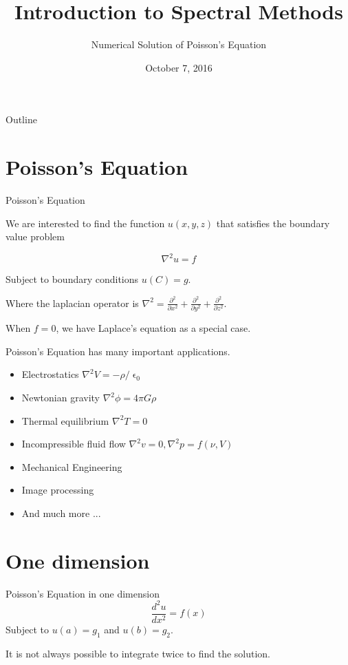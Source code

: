 \documentclass[xcolor={dvipsnames}]{beamer}
\title{Introduction to Spectral Methods}
\subtitle{Numerical Solution of Poisson's Equation}
\date{October 7, 2016}
\begin{document}
\begin{frame}
	\titlepage
\end{frame}

\begin{frame}{Outline}
	\tableofcontents
\end{frame}


\section{Poisson's Equation}
\begin{frame}{Poisson's Equation}{}

We are interested to find the function $u(x,y,z)$ that satisfies the boundary value problem

\begin{equation*}
\nabla^2 u = f
\end{equation*}

Subject to boundary conditions $u(C)=g$.

\pause
\bigskip
Where the laplacian operator is $\nabla^2=\frac{\partial^2}{\partial x^2}+\frac{\partial^2}{\partial y^2}+\frac{\partial^2}{\partial z^2}$.

\pause
\bigskip
When $f=0$, we have Laplace's equation as a special case.
\end{frame}


\begin{frame}{Poisson's Equation has many important applications.}{}
\begin{itemize}[<+->]
\item Electrostatics $\nabla^2 V = - \rho/\upvarepsilon_0$
\item Newtonian gravity $\nabla^2 \phi = 4\pi G\rho$
\item Thermal equilibrium $\nabla^2 T = 0$
\item Incompressible fluid flow $\nabla^2 v = 0, \nabla^2 p = f(\nu,V)$
\item Mechanical Engineering 
\item Image processing
\item And much more ...
\end{itemize}

\end{frame}


\section{One dimension}
\begin{frame}{Poisson's Equation in one dimension}{}
\begin{equation*}
\frac{d^2u}{dx^2}=f(x)
\end{equation*}
\vfill
Subject to $u(a)=g_1$ and  $u(b)=g_2$.

\bigskip
It is not always possible to integrate twice to find the solution.
\end{frame}
\end{document}
